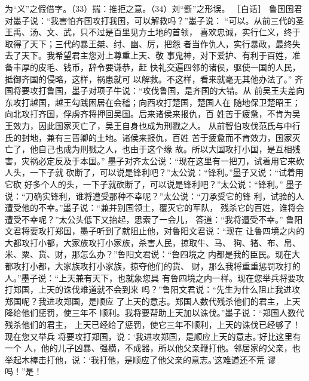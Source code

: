 \documentclass[12pt,UTF8]{ctexbook}
\begin{document}
为“义”之假借字。（33）揣：推拒之意。（34）刘“斵”之形误。 
［白话］ 
鲁国国君对墨子说：“我害怕齐国攻打我国，可以解救吗？”墨子说： 
“可以。从前三代的圣王禹、汤、文、武，只不过是百里见方土地的首领， 
喜欢忠诚，实行仁义，终于取得了天下；三代的暴王桀、纣、幽、厉，把怨 
者当作仇人，实行暴政，最终失去了天下。我希望君主您对上尊重上天、敬 
事鬼神，对下爱护、有利于百姓，准备丰厚的皮毛、钱币，辞令要谦恭，赶 
快礼交遍四邻的诸侯，驱使一国的人民，抵御齐国的侵略，这样，祸患就可 
以解救。不这样，看来就毫无其他办法了。” 
齐国将要攻打鲁国，墨子对项子牛说：“攻伐鲁国，是齐国的大错。从 
前吴王夫差向东攻打越国，越王勾践困居在会稽；向西攻打楚国，楚国人在 
随地保卫楚昭王；向北攻打齐国，俘虏齐将押回吴国。后来诸侯来报仇，百 
姓苦于疲惫，不肯为吴王效力，因此国家灭亡了，吴王自身也成为刑戮之人。 
从前智伯攻伐范氏与中行氏的封地，兼有三晋卿的土地。诸侯来报仇，百姓 
苦于疲惫而不肯效力，国家灭亡了，他自己也成为刑戮之人，也由于这个缘 
故。所以大国攻打小国，是互相残害，灾祸必定反及于本国。” 
墨子对齐太公说：“现在这里有一把刀，试着用它来砍人头，一下子就 
砍断了，可以说是锋利吧？”太公说：“锋利。”墨子又说：“试着用它砍 
好多个人的头，一下子就砍断了，可以说是锋利吧？”太公说：“锋利。” 
墨子说：“刀确实锋利，谁将遭受那种不幸呢？”太公说：“刀承受它的锋 
利，试验的人遭受他的不幸。”墨子说：“兼并别国领土，覆灭它的军队， 
残杀它的百姓，谁将会遭受不幸呢？”太公头低下又抬起，思索了一会儿， 
答道：“我将遭受不幸。” 
鲁阳文君将要攻打郑国，墨子听到了就阻止他，对鲁阳文君说：“现在 
让鲁四境之内的大都攻打小都，大家族攻打小家族，杀害人民，掠取牛、马、 
狗、猪、布、帛、米、粟、货、财，那怎么办？”鲁阳文君说：“鲁四境之 
内都是我的臣民。现在大都攻打小都，大家族攻打小家族，掠夺他们的货、 
财，那么我将重重惩罚攻打的人。”墨子说：“上天兼有天下，也就象您具 
有鲁四境之内一样。现在您举兵将要攻打郑国，上天的诛伐难道就不会到来 
吗？”鲁阳文君说：“先生为什么阻止我进攻郑国呢？我进攻郑国，是顺应 
了上天的意志。郑国人数代残杀他们的君主，上天降给他们惩罚，使三年不 
顺利。我将要帮助上天加以诛伐。”墨子说：“郑国人数代残杀他们的君主， 
上天已经给了惩罚，使它三年不顺利，上天的诛伐已经够了！现在您又举兵 
将要攻打郑国，说：‘我进攻郑国，是顺应上天的意志。’好比这里有一个 
人，他的儿子凶暴、强横，不成器，所以他父亲鞭打他。邻居家的父亲，也 
举起木棒击打他，说：‘我打他，是顺应了他父亲的意志。’这难道还不荒 
谬吗！”是！ 
\end{document}
